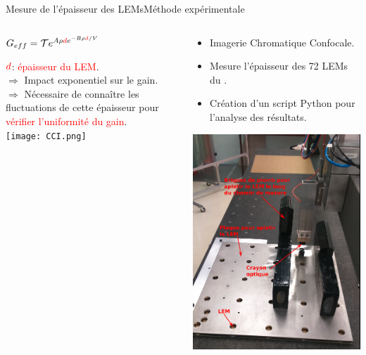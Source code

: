      \begin{frame}{Mesure de l'épaisseur des LEMs}{Méthode expérimentale}
    	\begin{scriptsize}
    		\begin{columns}
    			\begin{column}{0.5\textwidth}
    				\begin{center}
    					$G _{eff}= \mathcal{T}e^{A\rho \textcolor{red}{d} e^{-B\rho \textcolor{red}{d}/V}}$\\
    				\end{center}
    				$\textcolor{red}{d}$: \textcolor{red}{épaisseur du LEM}.\\
    				$\Rightarrow$ Impact exponentiel sur le gain.\\
    				$\Rightarrow$ Nécessaire de connaître les fluctuations de cette épaisseur pour \textcolor{red}{vérifier l'uniformité du gain}.\\
    				\vfill
    				\centering \texttt{[image: CCI.png]}\\\vfill
    			\end{column}
    			\hfill
    			\begin{column}{0.5\textwidth}
    				\begin{itemize}
    					\item Imagerie Chromatique Confocale.
    					\item Mesure l'épaisseur des 72 LEMs du \SSS{}.
    					\item Création d'un script Python pour l'analyse des résultats.
    				\end{itemize}
    				\centering \includegraphics[height=0.6\textheight]{./pictures/plate_and_bricks.png}\\

\end{column}
\end{columns}
\end{scriptsize}
\end{frame}
